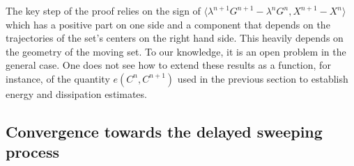 \documentclass[]{jnsao}
\begin{document}
\begin{remark}
	The key step of the  proof relies on the sign of 
	$\langle\lambda^{n+1}  G^{n+1} - \lambda^n G^n, X^{n+1}-X^n \rangle$ which has a 
	positive part on one side and a component that depends on the trajectories of the 
	set's centers on the right hand side.
	This heavily depends on the geometry of the moving set. To our knowledge, it is an open
	problem in the general case. One does not see how to extend these results as 
	a function, for instance, of the quantity $e(C^{n},C^{n+1})$ used in the previous 
	section to establish energy and dissipation estimates.   
\end{remark} 
 
 
 \subsection{Convergence towards the delayed sweeping process}
 
\end{document}
